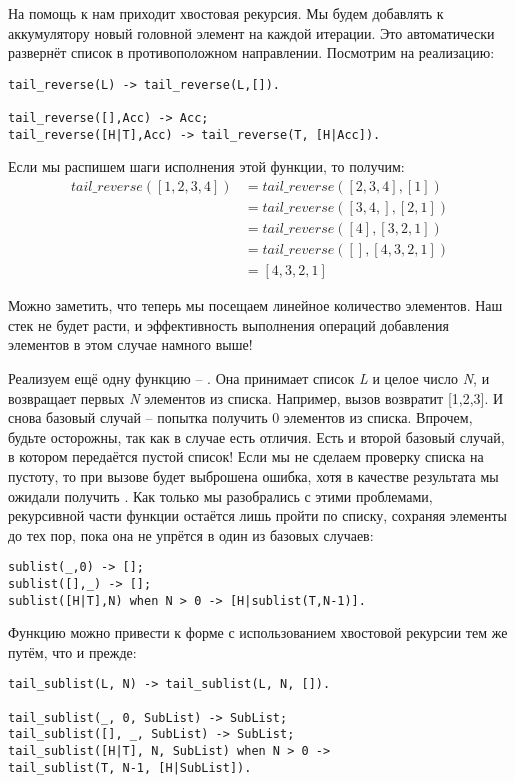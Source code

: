 На помощь к нам приходит хвостовая рекурсия. Мы будем добавлять к аккумулятору новый головной элемент на каждой итерации. Это автоматически развернёт список в противоположном направлении. Посмотрим на реализацию:
\begin{lstlisting}[style=erlang]
tail_reverse(L) -> tail_reverse(L,[]).
 
tail_reverse([],Acc) -> Acc;
tail_reverse([H|T],Acc) -> tail_reverse(T, [H|Acc]).
\end{lstlisting}

Если мы распишем шаги исполнения этой функции, то получим:
\begin{align*}
tail\_reverse([1,2,3,4]) &= tail\_reverse([2,3,4], [1])\\
&= tail\_reverse([3,4,], [2,1])\\
&= tail\_reverse([4], [3,2,1])\\
&= tail\_reverse([], [4,3,2,1])\\
&= [4,3,2,1]
\end{align*}

Можно заметить, что теперь мы посещаем линейное количество элементов. Наш стек не будет расти, и эффективность выполнения операций добавления элементов в этом случае намного выше!

Реализуем ещё одну функцию \--- . Она принимает список \emph{L} и целое число \emph{N}, и возвращает первых \emph{N} элементов из списка. Например, вызов  возвратит [1,2,3]. И снова базовый случай \--- попытка получить 0 элементов из списка. Впрочем, будьте осторожны, так как в случае  есть отличия. Есть и второй базовый случай, в котором передаётся пустой список! Если мы не сделаем проверку списка на пустоту, то при вызове  будет выброшена ошибка, хотя в качестве результата мы ожидали получить \ops{[1]}. Как только мы разобрались с этими проблемами, рекурсивной части функции остаётся лишь пройти по списку, сохраняя элементы до тех пор, пока она не упрётся в один из базовых случаев:
\begin{lstlisting}[style=erlang]
sublist(_,0) -> [];
sublist([],_) -> [];
sublist([H|T],N) when N > 0 -> [H|sublist(T,N-1)].
\end{lstlisting}

Функцию можно привести к форме с использованием хвостовой рекурсии тем же путём, что и прежде:
\begin{lstlisting}[style=erlang]
tail_sublist(L, N) -> tail_sublist(L, N, []).
 
tail_sublist(_, 0, SubList) -> SubList;
tail_sublist([], _, SubList) -> SubList;
tail_sublist([H|T], N, SubList) when N > 0 ->
tail_sublist(T, N-1, [H|SubList]).
\end{lstlisting}


